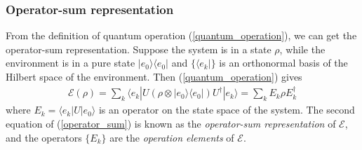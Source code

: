\documentclass{article}
\newcommand{\ket}[1]{| #1 \rangle}  %
\newcommand{\bra}[1]{\langle #1|} %
\begin{document}
\subsubsection{Operator-sum representation}
From the definition of quantum operation (\ref{quantum_operation}), we can get the operator-sum representation. Suppose the system is in a state $\rho$, while the environment is in a pure state $\ket{e_0}\bra{e_0}$ and $\{\bra{e_k}\}$ is an orthonormal basis of the Hilbert space of the environment. Then (\ref{quantum_operation}) gives
\begin{align}
	\mathcal{E}(\rho)= \sum_k \bra{e_k}U \left(\rho\otimes \ket{e_0}\bra{e_0}\right) U^{\dagger}\ket{e_k}=\sum_k E_k\rho E_k^{\dagger} \label{operator_sum}
\end{align}
where $E_k=\bra{e_k}U\ket{e_0}$ is an operator on the state space of the system. The second equation of (\ref{operator_sum}) is known as the \textit{operator-sum representation} of $\mathcal{E}$, and the operators $\{E_k\}$ are the \textit{operation elements} of $\mathcal{E}$. 
\end{document}
